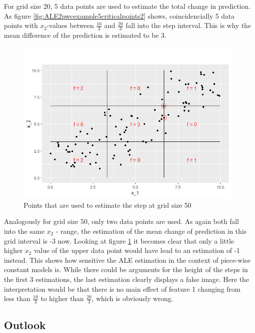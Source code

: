 \documentclass[]{krantz}
\begin{document}
For grid size 20, 5 data points are used to estimate the total change in
prediction. As figure \ref{fig:ALE2pwcexample5criticalpoints2} shows,
coincidencially 5 data points with \(x_2\)-values between
\(\frac{10}{3}\) and \(\frac{20}{3}\) fall into the step interval. This
is why the mean difference of the prediction is estimated to be 3.

\begin{figure}
\includegraphics[width=1\linewidth]{images/ALE_2_pwc_example5_critical_points_} \caption{Points that are used to estimate the
step at grid size 50}\label{fig:ALE2pwcexample5criticalpoints}
\end{figure}




Analogously for grid size 50, only two data points are used. As again
both fall into the same \(x_2\) - range, the estimation of the mean
change of prediction in this grid interval is -3 now. Looking at figure
\ref{fig:ALE2pwcexample5criticalpoints} it becomes clear that only a
little higher \(x_2\) value of the upper data point would have lead to
an estimation of -1 instead. This shows how sensitive the ALE estimation
in the context of piece-wise constant models is. While there could be
arguments for the height of the steps in the first 3 estimations, the
last estimation clearly displays a false image. Here the interpretation
would be that there is no main effect of feature 1 changing from less
than \(\frac{10}{3}\) to higher than \(\frac{20}{3}\), which is
obviously wrong.

\subsection{Outlook}\label{outlook}
\end{document}
